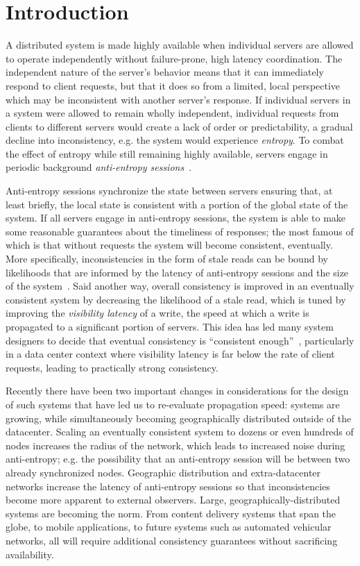 \section*{Introduction}

A distributed system is made highly available when individual servers are
allowed to operate independently without failure-prone, high latency
coordination.
The independent nature of the server's behavior means that it can immediately
respond to client requests, but that it does so from a limited, local
perspective which may be inconsistent with another server's response.
If individual servers in a system were allowed to remain wholly independent,
individual requests from clients to different servers would create a lack of
order or predictability, a gradual decline into inconsistency, e.g. the
system would experience \textit{entropy}.
To combat the effect of entropy while still remaining highly available,
servers engage in periodic background \textit{anti-entropy
  sessions}~\cite{terry_session_1994}.

Anti-entropy sessions synchronize the state between servers ensuring that,
at least briefly, the local state is consistent with a portion of the global
state of the system.
If all servers engage in anti-entropy sessions, the system is able to make
some reasonable guarantees about the timeliness of responses; the most famous
of which is that without requests the system will become
consistent, eventually.
More specifically, inconsistencies in the form of stale reads can be bound by
likelihoods that are informed by the latency of anti-entropy sessions and the
size of the system~\cite{bailis_quantifying_2014}.
Said another way, overall consistency is improved in an eventually consistent
system by decreasing the likelihood of a stale read, which is tuned by
improving the \textit{visibility latency} of a write, the speed at which a
write is propagated to a significant portion of servers.
This idea has led many system designers to decide that eventual consistency
is ``consistent enough''~\cite{bermbach_eventual_2011,wada_data_2011},
particularly in a data center context where visibility latency is far below
the rate of client requests, leading to practically strong consistency.

Recently there have been two important changes in considerations for the
design of such systems that have led us to re-evaluate propagation speed:
systems are growing, while simultaneously becoming geographically distributed
outside of the datacenter.
Scaling an eventually consistent system to dozens or even hundreds of nodes
increases the radius of the network, which leads to increased noise during
anti-entropy; e.g. the possibility that an anti-entropy session will be
between two already synchronized nodes.
Geographic distribution and extra-datacenter networks increase the latency of
anti-entropy sessions so that inconsistencies become more apparent to
external observers.
Large, geographically-distributed systems are becoming the norm.
From content delivery systems that span the globe, to mobile applications, to
future systems such as automated vehicular networks, all will require
additional consistency guarantees without sacrificing availability.

